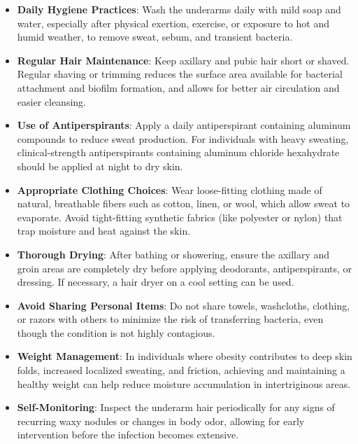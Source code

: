 \begin{itemize}
    \item \textbf{Daily Hygiene Practices}: Wash the underarms daily with mild soap and water, especially after physical exertion, exercise, or exposure to hot and humid weather, to remove sweat, sebum, and transient bacteria.
    \item \textbf{Regular Hair Maintenance}: Keep axillary and pubic hair short or shaved. Regular shaving or trimming reduces the surface area available for bacterial attachment and biofilm formation, and allows for better air circulation and easier cleansing.
    \item \textbf{Use of Antiperspirants}: Apply a daily antiperspirant containing aluminum compounds to reduce sweat production. For individuals with heavy sweating, clinical-strength antiperspirants containing aluminum chloride hexahydrate should be applied at night to dry skin.
    \item \textbf{Appropriate Clothing Choices}: Wear loose-fitting clothing made of natural, breathable fibers such as cotton, linen, or wool, which allow sweat to evaporate. Avoid tight-fitting synthetic fabrics (like polyester or nylon) that trap moisture and heat against the skin.
    \item \textbf{Thorough Drying}: After bathing or showering, ensure the axillary and groin areas are completely dry before applying deodorants, antiperspirants, or dressing. If necessary, a hair dryer on a cool setting can be used.
    \item \textbf{Avoid Sharing Personal Items}: Do not share towels, washcloths, clothing, or razors with others to minimize the risk of transferring bacteria, even though the condition is not highly contagious.
    \item \textbf{Weight Management}: In individuals where obesity contributes to deep skin folds, increased localized sweating, and friction, achieving and maintaining a healthy weight can help reduce moisture accumulation in intertriginous areas.
    \item \textbf{Self-Monitoring}: Inspect the underarm hair periodically for any signs of recurring waxy nodules or changes in body odor, allowing for early intervention before the infection becomes extensive.
\end{itemize}

